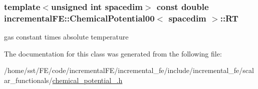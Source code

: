 \subsubsection[{\texorpdfstring{RT}{RT}}]{\setlength{\rightskip}{0pt plus 5cm}template$<$unsigned int spacedim$>$ const double {\bf incremental\+F\+E\+::\+Chemical\+Potential00}$<$ spacedim $>$\+::RT\hspace{0.3cm}{\ttfamily [private]}}\hypertarget{classincremental_f_e_1_1_chemical_potential00_a4c90a618bdb704a4d8d36438af323408}{}\label{classincremental_f_e_1_1_chemical_potential00_a4c90a618bdb704a4d8d36438af323408}
gas constant times absolute temperature 

The documentation for this class was generated from the following file\+:\begin{DoxyCompactItemize}
\item 
/home/sst/\+F\+E/code/incremental\+F\+E/incremental\+\_\+fe/include/incremental\+\_\+fe/scalar\+\_\+functionals/\hyperlink{chemical__potential__00_8h}{chemical\+\_\+potential\+\_.\+h}\end{DoxyCompactItemize}
